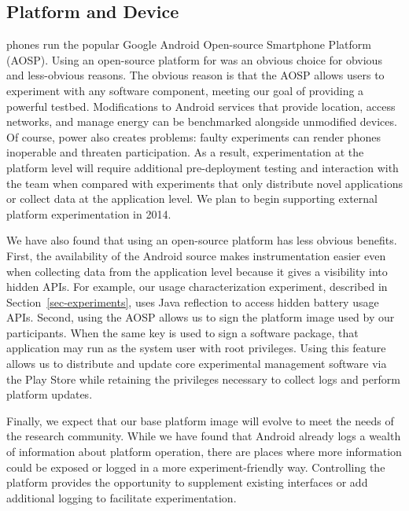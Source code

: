 

\subsection{Platform and Device}

\PhoneLab{} phones run the popular Google Android Open-source Smartphone
Platform (AOSP). Using an open-source platform for \PhoneLab{} was an obvious
choice for obvious and less-obvious reasons. The obvious reason is that the
AOSP allows \PhoneLab{} users to experiment with any software component,
meeting our goal of providing a powerful testbed. Modifications to Android
services that provide location, access networks, and manage energy can be
benchmarked alongside unmodified devices. Of course, power also creates
problems: faulty experiments can render phones inoperable and threaten
participation. As a result, experimentation at the platform level will
require additional pre-deployment testing and interaction with the
\PhoneLab{} team when compared with experiments that only distribute novel
applications or collect data at the application level. We plan to begin
supporting external platform experimentation in 2014.

We have also found that using an open-source platform has less obvious
benefits. First, the availability of the Android source makes \PhoneLab{}
instrumentation easier even when collecting data from the application level
because it gives a visibility into hidden APIs. For example, our usage
characterization experiment, described in Section~\ref{sec-experiments}, uses
Java reflection to access hidden battery usage APIs. Second, using the AOSP
allows us to sign the platform image used by our participants. When the same
key is used to sign a software package, that application may run as the
system user with root privileges. Using this feature allows us to distribute
and update core \PhoneLab{} experimental management software via the Play
Store while retaining the privileges necessary to collect logs and perform
platform updates.

Finally, we expect that our base \PhoneLab{} platform image will evolve to
meet the needs of the research community. While we have found that Android
already logs a wealth of information about platform operation, there are
places where more information could be exposed or logged in a more
experiment-friendly way. Controlling the platform provides the opportunity to
supplement existing interfaces or add additional logging to facilitate
experimentation.

